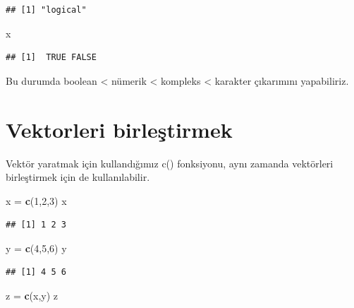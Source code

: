 \documentclass[
]{book}
\newenvironment{Shaded}{\begin{snugshade}}{\end{snugshade}}
\newcommand{\DecValTok}[1]{\textcolor[rgb]{0.00,0.00,0.81}{#1}}
\newcommand{\KeywordTok}[1]{\textcolor[rgb]{0.13,0.29,0.53}{\textbf{#1}}}
\newcommand{\NormalTok}[1]{#1}
\newcommand{\StringTok}[1]{\textcolor[rgb]{0.31,0.60,0.02}{#1}}
\begin{document}
\begin{verbatim}
## [1] "logical"
\end{verbatim}

\begin{Shaded}
\begin{Highlighting}[]
\NormalTok{x}
\end{Highlighting}
\end{Shaded}

\begin{verbatim}
## [1]  TRUE FALSE
\end{verbatim}

Bu durumda boolean \textless{} nümerik \textless{} kompleks \textless{} karakter çıkarımını yapabiliriz.

\hypertarget{vektorleri-birleux15ftirmek}{%
\section{Vektorleri birleştirmek}\label{vektorleri-birleux15ftirmek}}

Vektör yaratmak için kullandığımız c() fonksiyonu, aynı zamanda vektörleri birleştirmek için de kullanılabilir.

\begin{Shaded}
\begin{Highlighting}[]
\NormalTok{x =}\StringTok{ }\KeywordTok{c}\NormalTok{(}\DecValTok{1}\NormalTok{,}\DecValTok{2}\NormalTok{,}\DecValTok{3}\NormalTok{)}
\NormalTok{x}
\end{Highlighting}
\end{Shaded}

\begin{verbatim}
## [1] 1 2 3
\end{verbatim}

\begin{Shaded}
\begin{Highlighting}[]
\NormalTok{y =}\StringTok{ }\KeywordTok{c}\NormalTok{(}\DecValTok{4}\NormalTok{,}\DecValTok{5}\NormalTok{,}\DecValTok{6}\NormalTok{)}
\NormalTok{y}
\end{Highlighting}
\end{Shaded}

\begin{verbatim}
## [1] 4 5 6
\end{verbatim}

\begin{Shaded}
\begin{Highlighting}[]
\NormalTok{z =}\StringTok{ }\KeywordTok{c}\NormalTok{(x,y)}
\NormalTok{z}
\end{Highlighting}
\end{Shaded}
\end{document}
